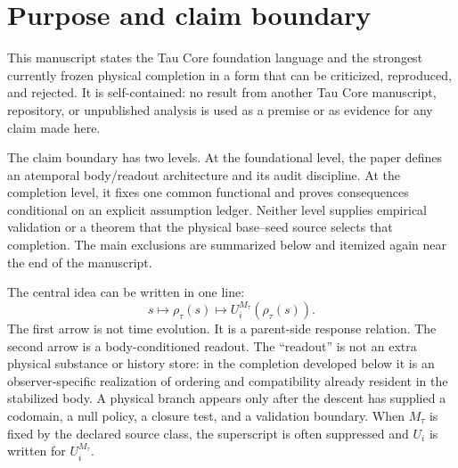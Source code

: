 \documentclass[11pt]{article}
\newcommand{\Rmap}{\rho_{\tau}}
\newcommand{\Mta}{M_{\tau}}
\begin{document}
\clearpage
{\small\tableofcontents}
\clearpage

\section{Purpose and claim boundary}

This manuscript states the Tau Core foundation language and the strongest
currently frozen physical completion in a form that can be criticized,
reproduced, and rejected.  It is self-contained: no result from another Tau
Core manuscript, repository, or unpublished analysis is used as a premise or
as evidence for any claim made here.

The claim boundary has two levels.  At the foundational level, the paper
defines an atemporal body/readout architecture and its audit discipline.  At
the completion level, it fixes one common functional and proves consequences
conditional on an explicit assumption ledger.  Neither level supplies
empirical validation or a theorem that the physical base--seed source selects
that completion.  The main exclusions are summarized below and itemized again
near the end of the manuscript.

\begin{center}
\end{center}

The central idea can be written in one line:
\begin{equation}
  s \longmapsto \Rmap(s) \longmapsto U_i^{\Mta}(\Rmap(s)).
  \label{eq:core-spine}
\end{equation}
The first arrow is not time evolution.  It is a parent-side response relation.
The second arrow is a body-conditioned readout.  The ``readout'' is not an
extra physical substance or history store: in the completion developed below
it is an observer-specific realization of ordering and compatibility already
resident in the stabilized body.  A physical branch appears only after the
descent has supplied a codomain, a null policy, a closure test, and a
validation boundary.  When \(\Mta\) is fixed by the declared source class, the
superscript is often suppressed and \(U_i\) is written for
\(U_i^{\Mta}\).
\end{document}
